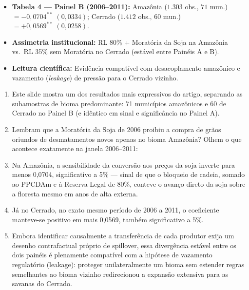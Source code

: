 \documentclass[11pt,a4paper]{article}
\begin{document}
\begin{tcolorbox}[title={\bfseries\small ÂNCORAS EMPÍRICAS E CONCEITUAIS DO SLIDE}]
\begin{itemize}[leftmargin=*,itemsep=1mm,topsep=0.5mm]
    \item \textbf{Tabela 4 — Painel B (2006--2011):} Amazônia ($1.303$ obs., $71$ mun.) $= -0{,}0704^{**}\;(0{,}0334)$; Cerrado ($1.412$ obs., $60$ mun.) $= +0{,}0569^{**}\;(0{,}0258)$.
    \item \textbf{Assimetria institucional:} RL 80\% + Moratória da Soja na Amazônia vs.\ RL 35\% sem Moratória no Cerrado (estável entre Painéis A e B).
    \item \textbf{Leitura científica:} Evidência compatível com desacoplamento amazônico e vazamento (\textit{leakage}) de pressão para o Cerrado vizinho.
\end{itemize}
\end{tcolorbox}
\vspace{2mm}

\vspace{0.8mm}
\begin{enumerate}[leftmargin=*,label=\textbf{(\arabic*)},itemsep=2.8mm,topsep=1mm]
    \item Este slide mostra um dos resultados mais expressivos do artigo, separando as subamostras de bioma predominante: 71 municípios amazônicos e 60 de Cerrado no Painel B (e idêntico em sinal e significância no Painel A).
    \item Lembram que a Moratória da Soja de 2006 proibiu a compra de grãos oriundos de desmatamentos novos apenas no bioma Amazônia? Olhem o que acontece exatamente na janela 2006–2011:
    \item Na Amazônia, a sensibilidade da conversão aos preços da soja inverte para menos 0,0704, significativo a 5\% — sinal de que o bloqueio de cadeia, somado ao PPCDAm e à Reserva Legal de 80\%, conteve o avanço direto da soja sobre a floresta mesmo em anos de alta externa.
    \item Já no Cerrado, no exato mesmo período de 2006 a 2011, o coeficiente manteve-se positivo em mais 0,0569, também significativo a 5\%.
    \item Embora identificar causalmente a transferência de cada produtor exija um desenho contrafactual próprio de spillover, essa divergência estável entre os dois painéis é plenamente compatível com a hipótese de vazamento regulatório (leakage): proteger unilateralmente um bioma sem estender regras semelhantes ao bioma vizinho redirecionou a expansão extensiva para as savanas do Cerrado.
\end{enumerate}
\end{document}
